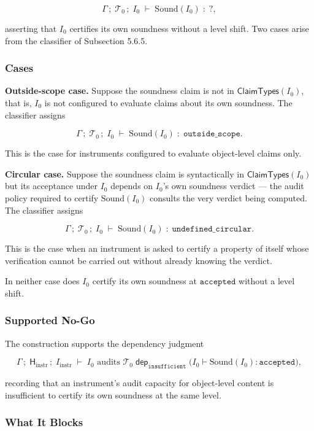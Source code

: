 \documentclass[11pt]{article}
\theoremstyle{definition}
\begin{document}
\[
\Gamma\,;\;\mathcal T_0\,;\;I_0\;\vdash\;\mathrm{Sound}(I_0)\;:\;?,
\]

asserting that \(I_0\) certifies its own soundness without a level shift. Two cases arise from the classifier of Subsection 5.6.5.

\subsubsection{Cases}

\textbf{Outside-scope case.} Suppose the soundness claim is not in \(\mathsf{ClaimTypes}(I_0)\), that is, \(I_0\) is not configured to evaluate claims about its own soundness. The classifier assigns

\[
\Gamma\,;\;\mathcal T_0\,;\;I_0\;\vdash\;\mathrm{Sound}(I_0)\;:\;\texttt{outside\_scope}.
\]

This is the case for instruments configured to evaluate object-level claims only.

\textbf{Circular case.} Suppose the soundness claim is syntactically in \(\mathsf{ClaimTypes}(I_0)\) but its acceptance under \(I_0\) depends on \(I_0\)'s own soundness verdict --- the audit policy required to certify \(\mathrm{Sound}(I_0)\) consults the very verdict being computed. The classifier assigns

\[
\Gamma\,;\;\mathcal T_0\,;\;I_0\;\vdash\;\mathrm{Sound}(I_0)\;:\;\texttt{undefined\_circular}.
\]

This is the case when an instrument is asked to certify a property of itself whose verification cannot be carried out without already knowing the verdict.

In neither case does \(I_0\) certify its own soundness at \(\texttt{accepted}\) without a level shift.

\subsubsection{Supported No-Go}

The construction supports the dependency judgment

\[
\Gamma\,;\;\mathsf H_{\mathrm{instr}}\,;\;I_{\mathrm{instr}}\;\vdash\;I_0\text{ audits }\mathcal T_0\;\mathrel{\mathsf{dep}_{\texttt{insufficient}}}\;\bigl(I_0\vdash\mathrm{Sound}(I_0):\texttt{accepted}\bigr),
\]

recording that an instrument's audit capacity for object-level content is insufficient to certify its own soundness at the same level.

\subsubsection{What It Blocks}
\end{document}
